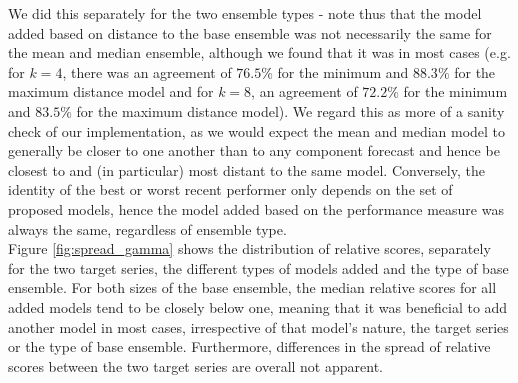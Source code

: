 We did this separately for the two ensemble types - note thus that the model added based on distance to the base ensemble was not necessarily the same for the mean and median ensemble, although we found that it was in most cases (e.g. for $k = 4$, there was an agreement of $76.5\%$ for the minimum and $88.3\%$ for the maximum distance model and for $k = 8$, an agreement of $72.2\%$ for the minimum and $83.5\%$ for the maximum distance model). We regard this as more of a sanity check of our implementation, as we would expect the mean and median model to generally be closer to one another than to any component forecast and hence be closest to and (in particular) most distant to the same model. Conversely, the identity of the best or worst recent performer only depends on the set of proposed models, hence the model added based on the performance measure was always the same, regardless of ensemble type.\\
Figure \ref{fig:spread_gamma} shows the distribution of relative scores, separately for the two target series, the different types of models added and the type of base ensemble. For both sizes of the base ensemble, the median relative scores for all added models tend to be closely below one, meaning that it was beneficial to add another model in most cases, irrespective of that model's nature, the target series or the type of base ensemble. Furthermore, differences in the spread of relative scores between the two target series are overall not apparent. \\
